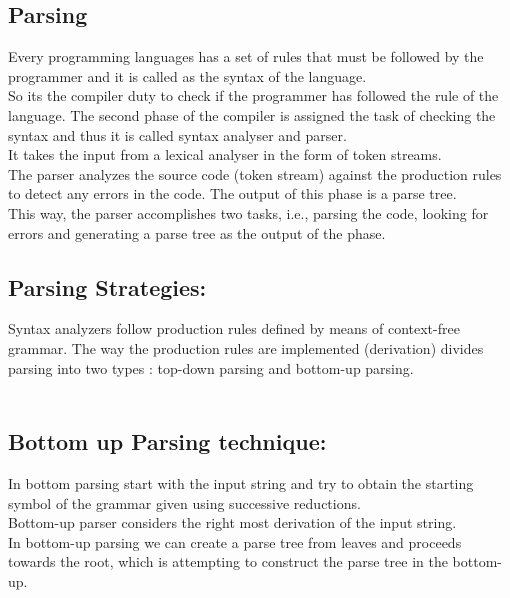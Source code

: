 \documentclass[12pt]{article}
\begin{document}
{\subsection{Parsing}
Every programming languages has a set of rules that must be followed by the programmer
and it is called as the syntax of the language.\\
So its the compiler duty to check if the programmer has followed the rule of the language.
The second phase of the compiler is assigned the task of checking the syntax
and thus it is called syntax analyser and parser.\\
It takes the input from a lexical analyser in the form of token streams.\\
The parser analyzes the source code (token stream) against the production rules to
detect any errors in the code. The output of this phase is a parse tree.\\
This way, the parser accomplishes two tasks, i.e., parsing the code, looking for errors
and generating a parse tree as the output of the phase.\\

\subsection{Parsing Strategies:}
Syntax analyzers follow production rules defined by means of context-free grammar.
The way the production rules are implemented (derivation) divides parsing into two types :
top-down parsing and bottom-up parsing.\\\\

\subsection{Bottom up Parsing technique:}
In bottom parsing start with the input string and try to obtain the starting symbol of the
grammar given using successive reductions.\\
Bottom-up parser considers the right most derivation of the input string.\\
In bottom-up parsing we can create a parse tree from leaves and proceeds towards the
root, which is attempting to construct the parse tree in the bottom-up.\\\\

}
\end{document}
